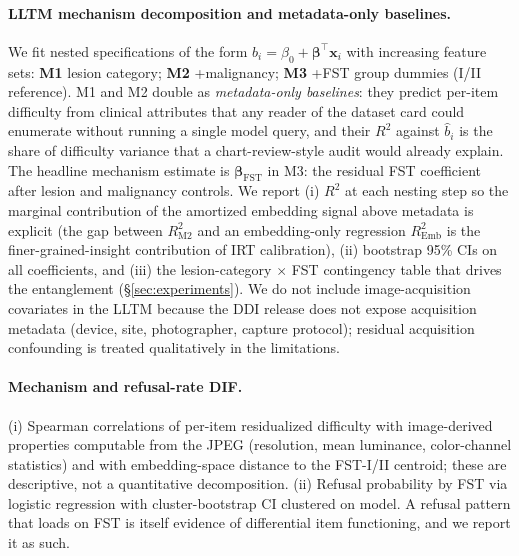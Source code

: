 \documentclass{article}
\begin{document}
\paragraph{LLTM mechanism decomposition and metadata-only baselines.}
\label{sec:lltm}
We fit nested specifications of the form $b_i = \beta_0 + \boldsymbol{\beta}^\top \mathbf{x}_i$ with increasing feature sets: \textbf{M1} lesion category; \textbf{M2} +malignancy; \textbf{M3} +FST group dummies (I/II reference). M1 and M2 double as \emph{metadata-only baselines}: they predict per-item difficulty from clinical attributes that any reader of the dataset card could enumerate without running a single model query, and their $R^2$ against $\hat b_i$ is the share of difficulty variance that a chart-review-style audit would already explain. The headline mechanism estimate is $\boldsymbol{\beta}_{\text{FST}}$ in M3: the residual FST coefficient after lesion and malignancy controls. We report (i) $R^2$ at each nesting step so the marginal contribution of the amortized embedding signal above metadata is explicit (the gap between $R^2_{\text{M2}}$ and an embedding-only regression $R^2_{\text{Emb}}$ is the finer-grained-insight contribution of IRT calibration), (ii) bootstrap 95\% CIs on all coefficients, and (iii) the lesion-category $\times$ FST contingency table that drives the entanglement (\S\ref{sec:experiments}). We do not include image-acquisition covariates in the LLTM because the DDI release does not expose acquisition metadata (device, site, photographer, capture protocol); residual acquisition confounding is treated qualitatively in the limitations.

\paragraph{Mechanism and refusal-rate DIF.}
\label{sec:refusal}
(i) Spearman correlations of per-item residualized difficulty with image-derived properties computable from the JPEG (resolution, mean luminance, color-channel statistics) and with embedding-space distance to the FST-I/II centroid; these are descriptive, not a quantitative decomposition. (ii) Refusal probability by FST via logistic regression with cluster-bootstrap CI clustered on model. A refusal pattern that loads on FST is itself evidence of differential item functioning, and we report it as such.
\end{document}
